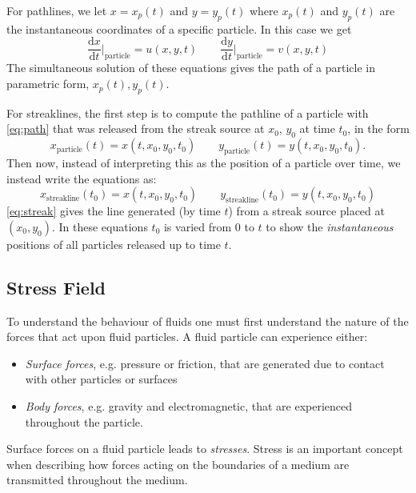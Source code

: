 For pathlines, we let $x = x_p(t)$ and $y = y_p(t)$ where $x_p(t)$ and $y_p(t)$ are the instantaneous coordinates of a specific particle. In this case we get
\begin{equation} \label{eq:path}
  \frac{\mathrm{d}x}{\mathrm{d}t} \bigg|_{\text{particle}} = u(x,y,t) \qquad \frac{\mathrm{d}y}{\mathrm{d}t} \bigg|_{\text{particle}} = v(x,y,t)
\end{equation}
The simultaneous solution of these equations gives the path of a particle in parametric form, $x_p(t), y_p(t)$.

For streaklines, the first step is to compute the pathline of a particle with \autoref{eq:path} that was released from the streak source at $x_0$, $y_0$ at time $t_0$, in the form
\[ 
x_{\text{particle}} (t) = x(t, x_0, y_0, t_0) \qquad y_{\text{particle}}(t) = y(t, x_0, y_0, t_0)
.\]
Then now, instead of interpreting this as the position of a particle over time, we instead write the equations as:
\begin{equation}\label{eq:streak}
  x_{\text{streakline}} \left( t_0 \right) = x \left( t, x_0, y_0, t_0 \right) \qquad y_{\text{streakline}} \left( t_0 \right) = y \left( t, x_0, y_0, t_0 \right)
\end{equation}
\autoref{eq:streak} gives the line generated (by time $t$) from a streak source placed at $(x_0, y_0)$. In these equations $t_0$ is varied from $0$ to $t$ to show the \textit{instantaneous} positions of all particles released up to time $t$. 

\subsection{Stress Field}
To understand the behaviour of fluids one must first understand the nature of the forces that act upon fluid particles. A fluid particle can experience either:
\begin{itemize}
  \item \textit{Surface forces}, e.g. pressure or friction, that are generated due to contact with other particles or surfaces
  \item \textit{Body forces}, e.g. gravity and electromagnetic, that are experienced throughout the particle.
\end{itemize}

Surface forces on a fluid particle leads to \textit{stresses}. Stress is an important concept when describing how forces acting on the boundaries of a medium are transmitted throughout the medium. 

